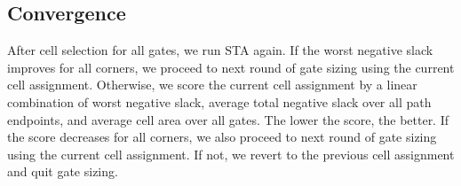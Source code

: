 \subsection{Convergence}
\label{sec:sizing_converge}
After cell selection for all gates, we run STA again. If the worst negative slack improves for all corners, we proceed to next round of gate sizing using the current cell assignment. Otherwise, we score the current cell assignment by a linear combination of worst negative slack, average total negative slack over all path endpoints, and average cell area over all gates. The lower the score, the better. If the score decreases for all corners, we also proceed to next round of gate sizing using the current cell assignment. If not, we revert to the previous cell assignment and quit gate sizing.


%


